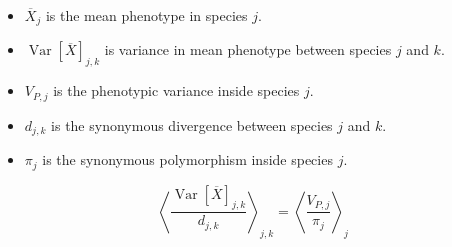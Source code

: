 \documentclass{article}
\DeclareMathOperator{\Var}{\text{Var}}
\newcommand{\VarPhenotypej}{V_{P, j}}
\newcommand{\Trait}{X}
\begin{document}
\newpage
\begin{itemize}
	\item $\overline{\Trait}_{j}$ is the mean phenotype in species $j$.
	\item $\Var \left[ \overline{\Trait}\right]_{j,k}$ is variance in mean phenotype between species $j$ and $k$.
	\item $\VarPhenotypej$ is the phenotypic variance inside species $j$.
	\item $d_{j,k}$ is the synonymous divergence between species $j$ and $k$.
	\item $\pi_{j}$ is the synonymous polymorphism inside species $j$.
\end{itemize}

\begin{equation}
	\left< \frac{ \Var \left[ \overline{\Trait}\right]_{j,k} }{ d_{j,k} } \right>_{j,k} = \left< \frac{ \VarPhenotypej }{ \pi_{j} }  \right>_{j}
\end{equation}
\end{document}
